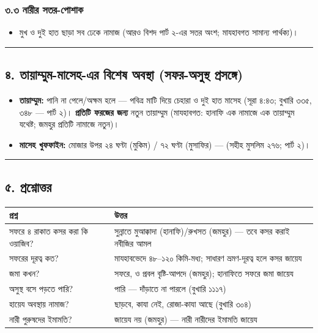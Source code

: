 \subsubsection*{৩.৩ নারীর সতর-পোশাক}

\begin{itemize}
\item মুখ ও দুই হাত ছাড়া সব ঢেকে নামাজ (আরও বিশদ পার্ট ২-এর সতর অংশ; মাযহাবগত সামান্য পার্থক্য)।
\end{itemize}
\medskip\hrule\medskip

\subsection*{৪. তায়াম্মুম-মাসেহ-এর বিশেষ অবস্থা (সফর-অসুস্থ প্রসঙ্গে)}

\begin{itemize}
\item \textbf{তায়াম্মুম:} পানি না পেলে/অক্ষম হলে — পবিত্র মাটি দিয়ে চেহারা ও দুই হাত মাসেহ (সূরা ৪:৪৩; বুখারি ৩৩৫, ৩৪৮ — পার্ট ২)। \textbf{প্রতিটি ফরজের জন্য} নতুন তায়াম্মুম (মাযহাবগত: হানাফি এক নামাজে এক তায়াম্মুম যথেষ্ট; জমহুর প্রতিটি নামাজে নতুন)।
\item \textbf{মাসেহ খুফফাইন:} মোজার উপর ২৪ ঘণ্টা (মুকিম) / ৭২ ঘণ্টা (মুসাফির) — (সহীহ মুসলিম ২৭৬; পার্ট ২)।
\end{itemize}
\medskip\hrule\medskip

\subsection*{৫. প্রশ্নোত্তর}

\begin{table}[h]\centering\small
\begin{tabular}{ll}
প্রশ্ন & উত্তর \\
\hline
সফরে ৪ রাকাত কসর করা কি ওয়াজিব? & সুন্নাতে মুআক্কাদা (হানাফি)/রুখসত (জমহুর) — তবে কসর করাই নবীজির আমল \\
সফরের দূরত্ব কত? & মাযহাবভেদে ৪৮–১২০ কিমি-মধ্য; সাধারণ ভ্রমণ-দূরত্ব হলে কসর জায়েয \\
জমা কখন? & সফরে, ও প্রবল বৃষ্টি-আপদে (জমহুর); হানাফিতে সফরে জমা জায়েয \\
অসুস্থ বসে পড়তে পারি? & পারি — দাঁড়াতে না পারলে (বুখারি ১১১৭) \\
হায়েয অবস্থায় নামাজ? & ছাড়বে, কাযা নেই, রোজা-কাযা আছে (বুখারি ৩০৪) \\
নারী পুরুষদের ইমামতি? & জায়েয নয় (জমহুর) — নারী নারীদের ইমামতি জায়েয \\
\hline
\end{tabular}
\end{table}

